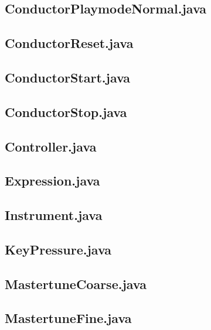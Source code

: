 \subsection{ ConductorPlaymodeNormal.java }

\subsection{ ConductorReset.java }

\subsection{ ConductorStart.java }

\subsection{ ConductorStop.java }

\subsection{ Controller.java }

\subsection{ Expression.java }

\subsection{ Instrument.java }

\subsection{ KeyPressure.java }

\subsection{ MastertuneCoarse.java }

\subsection{ MastertuneFine.java }

